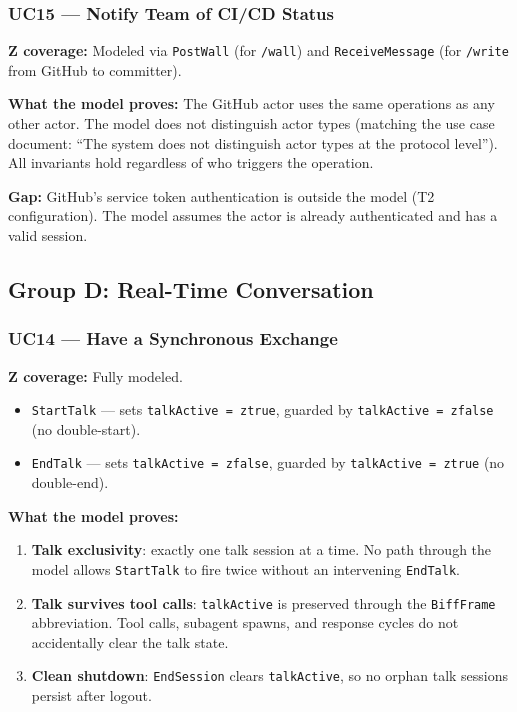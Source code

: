 \documentclass[a4paper,10pt,fleqn]{article}
\begin{document}
\subsubsection{UC15 --- Notify Team of CI/CD Status}

\textbf{Z coverage:} Modeled via \texttt{PostWall} (for \texttt{/wall})
and \texttt{ReceiveMessage} (for \texttt{/write} from GitHub to
committer).

\textbf{What the model proves:} The GitHub actor uses the same
operations as any other actor. The model does not distinguish actor
types (matching the use case document: ``The system does not distinguish
actor types at the protocol level''). All invariants hold regardless of
who triggers the operation.

\textbf{Gap:} GitHub's service token authentication is outside the
model (T2 configuration). The model assumes the actor is already
authenticated and has a valid session.

\subsection{Group D: Real-Time Conversation}

\subsubsection{UC14 --- Have a Synchronous Exchange}

\textbf{Z coverage:} Fully modeled.

\begin{itemize}
  \item \texttt{StartTalk} --- sets \texttt{talkActive = ztrue},
    guarded by \texttt{talkActive = zfalse} (no double-start).
  \item \texttt{EndTalk} --- sets \texttt{talkActive = zfalse},
    guarded by \texttt{talkActive = ztrue} (no double-end).
\end{itemize}

\textbf{What the model proves:}

\begin{enumerate}
  \item \textbf{Talk exclusivity}: exactly one talk session at a time.
    No path through the model allows \texttt{StartTalk} to fire twice
    without an intervening \texttt{EndTalk}.
  \item \textbf{Talk survives tool calls}: \texttt{talkActive} is
    preserved through the \texttt{BiffFrame} abbreviation. Tool calls,
    subagent spawns, and response cycles do not accidentally clear the
    talk state.
  \item \textbf{Clean shutdown}: \texttt{EndSession} clears
    \texttt{talkActive}, so no orphan talk sessions persist after logout.
\end{enumerate}
\end{document}
